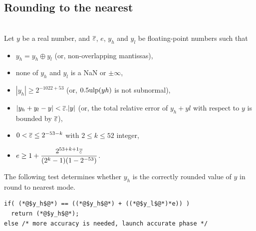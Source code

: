 \subsection{Rounding to the nearest}

\begin{theorem}
\label{th:roundingRN1}
~\\
Let $y$ be a real number, and  ${\overline{\varepsilon}}$, $e$, $y_h$ and $y_l$ be
  floating-point numbers such that 
  \begin{itemize}
  \item $y_h=y_h\oplus y_l$ (or, non-overlapping mantissas),
  \item none of $y_h$ and $y_l$ is a  NaN or $\pm \infty$,
  \item $|y_h|\ge 2^{-1022+53}$ (or, $0.5\mbox{ulp}(yh)$ is not subnormal), 
  \item $|y_h+y_l - y| <{\overline{\varepsilon}}.|y|$ (or, the total relative error of $y_h+yl$ with respect to $y$ is bounded by ${\overline{\varepsilon}}$),
  \item $0<{\overline{\varepsilon}} \le 2^{-53-k}$ with $2\le k \le 52$ integer,
  \item $e\ge 1+  \dfrac{2^{53+k+1}{\overline{\varepsilon}}}{(2^{k}-1)(1-2^{-53})}$.
\end{itemize}

The following test determines whether $y_h$ is the
  correctly rounded value of $y$ in  round to nearest mode.

\begin{lstlisting}[caption={Test for rounding to the nearest},
  firstnumber=1]
if( (*@$y_h$@*) == ((*@$y_h$@*) + ((*@$y_l$@*)*e)) )
  return (*@$y_h$@*);
else /* more accuracy is needed, launch accurate phase */
\end{lstlisting}
\end{theorem}


